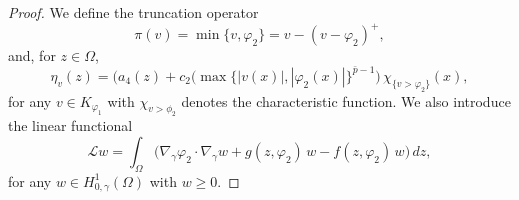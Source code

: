 \documentclass[11pt]{article}
\newcommand{\gradgr}{\nabla_{\gamma}}
\newcommand{\spacegr}{H^{1}_{0,\gamma}(\Omega)}
\begin{document}
\begin{proof}
We define the truncation operator
\begin{equation*}
\pi(v) = \min\{ v, \varphi_2\} = v - (v-\varphi_2)^{+},
\end{equation*}
and, for $z \in \Omega$,
\begin{equation*}
\eta_{v}(z) = \bigl( a_4(z) + c_2 ( \max\{ |v(x)|, |\varphi_2(x)|\} ^{\bar{p}-1} \bigr)\, \chi_{\{v>\varphi_2\}}(x),
\end{equation*}
for any $v \in K_{\varphi_1}$ with $\chi_{v > \phi_2}$ denotes the characteristic function. We also introduce the linear functional
\begin{equation*}
\mathcal{L}w = \int_{\Omega} \bigl( \gradgr \varphi_2 \cdot \gradgr w + g(z,\varphi_2)\, w - f(z,\varphi_2)\, w \bigr)\, dz,
\end{equation*}
for any $w \in \spacegr$ with $w \ge 0$.


\end{proof}
\end{document}
